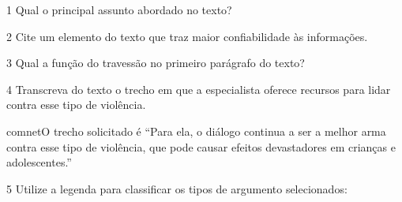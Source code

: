
\num{1} Qual o principal assunto abordado no texto?


\num{2} Cite um elemento do texto que traz maior confiabilidade às informações.


\num{3} Qual a função do travessão no primeiro parágrafo do texto?


\num{4} Transcreva do texto o trecho em que a especialista oferece recursos
para lidar contra esse tipo de violência. 

comnet{O trecho solicitado é ``Para ela, o diálogo continua a ser a melhor
arma contra esse tipo de violência, que pode causar efeitos devastadores em
crianças e adolescentes.''}

\num{5} Utilize a legenda para classificar os tipos de argumento selecionados:


